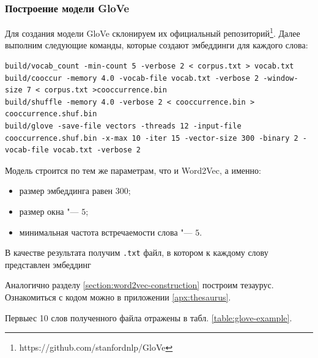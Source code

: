\documentclass[coursework]{SCWorks}
\begin{document}
\subsubsection{Построение модели GloVe}
Для создания модели GloVe склонируем их официальный репозиторий\footnote{https://github.com/stanfordnlp/GloVe}. Далее выполним следующие команды, которые создают эмбеддинги для каждого слова:
\begin{verbatim}
build/vocab_count -min-count 5 -verbose 2 < corpus.txt > vocab.txt
build/cooccur -memory 4.0 -vocab-file vocab.txt -verbose 2 -window-size 7 < corpus.txt >cooccurrence.bin
build/shuffle -memory 4.0 -verbose 2 < cooccurrence.bin > cooccurrence.shuf.bin
build/glove -save-file vectors -threads 12 -input-file cooccurrence.shuf.bin -x-max 10 -iter 15 -vector-size 300 -binary 2 -vocab-file vocab.txt -verbose 2
\end{verbatim}

Модель строится по тем же параметрам, что и Word2Vec, а именно:
\begin{itemize}
    \item размер эмбеддинга равен $300$;
    \item размер окна "--- $5$;
    \item минимальная частота встречаемости слова "--- $5$.
\end{itemize}

В качестве результата получим \verb|.txt| файл, в котором к каждому слову представлен эмбеддинг

Аналогично разделу \ref{section:word2vec-construction} построим тезаурус. Ознакомиться с кодом можно в приложении \ref{apx:thesaurus}.

Первыес 10 слов полученного файла отражены в табл. \ref{table:glove-example}.
\end{document}

